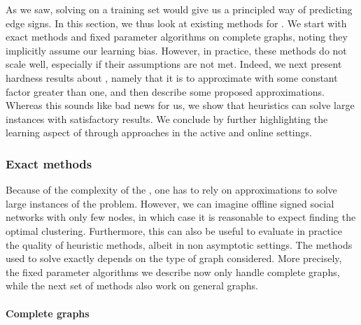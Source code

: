 As we saw, solving \pcc{} on a training set would give us a principled way of predicting edge signs.
In this section, we thus look at existing methods for \pcc{}. We start with exact methods and fixed
parameter algorithms on complete graphs, noting they implicitly assume our learning bias. However,
in practice, these methods do not scale well, especially if their assumptions are not met. Indeed,
we next present hardness results about \pcc{}, namely that it is \NPh{} to approximate with some
constant factor greater than one, and then describe some proposed approximations. Whereas this
sounds like bad news for us, we show that heuristics can solve large instances with satisfactory
results. We conclude by further highlighting the learning aspect of \pcc{} through approaches in
the active and online settings.

\subsubsection{Exact methods}
\label{ssub:cc_exact_methods}

Because of the complexity of the \pcc{}, one has to rely on approximations to solve large instances
of the problem. However, we can imagine offline signed social networks with only few nodes, in which
case it is reasonable to expect finding the optimal clustering. Furthermore, this can also be useful
to evaluate in practice the quality of heuristic methods, albeit in non asymptotic settings. The
methods used to solve \pcc{} exactly depends on the type of graph considered. More precisely, the
fixed parameter algorithms we describe now only handle complete graphs, while the next set of
methods also work on general graphs.

\paragraph{Complete graphs}
\label{par:cc_editing}


